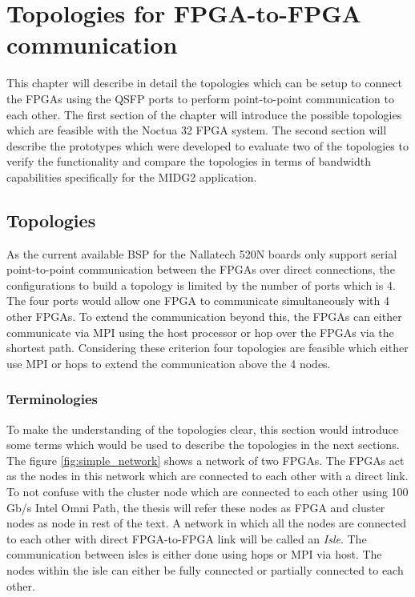 \chapter{Topologies for FPGA-to-FPGA communication}
\label{cha:topologies}

This chapter will describe in detail the topologies which can be setup to
connect the FPGAs using the QSFP ports to perform point-to-point communication
to each other. The first section of the chapter will introduce the possible
topologies which are feasible with the Noctua 32 FPGA system. The second
section will describe the prototypes which were developed to evaluate two
of the topologies to verify the functionality and compare the topologies
in terms of bandwidth capabilities specifically for the MIDG2 application.

\section{Topologies}

As the current available BSP for the Nallatech 520N boards only support serial
point-to-point communication between the FPGAs over direct connections, the
configurations to build a topology is limited by the number of ports which is 
4. The four ports would allow one FPGA to communicate simultaneously with 4
other FPGAs. To extend the communication beyond this, the FPGAs can either
communicate via MPI using the host processor or hop over the FPGAs via the
shortest path. Considering these criterion four topologies are feasible which
either use MPI or hops to extend the communication above the 4 nodes.


\subsection*{Terminologies}

To make the understanding of the topologies clear, this section would introduce
some terms which would be used to describe the topologies in the next sections.
The figure \ref{fig:simple_network} shows a network of two FPGAs.
The FPGAs act as the nodes in this network which are connected to each other
with a direct link. To not confuse with the cluster node which are connected to
each other using 100 Gb/s Intel Omni Path, the thesis will refer
these nodes as FPGA and cluster nodes as node in rest of the text. A network in
which all the nodes are connected to each other with direct FPGA-to-FPGA link
will be called an \textit{Isle}. The communication between isles is either done
using hops or MPI via host. The nodes within the isle can either be fully
connected or partially connected to each other.

